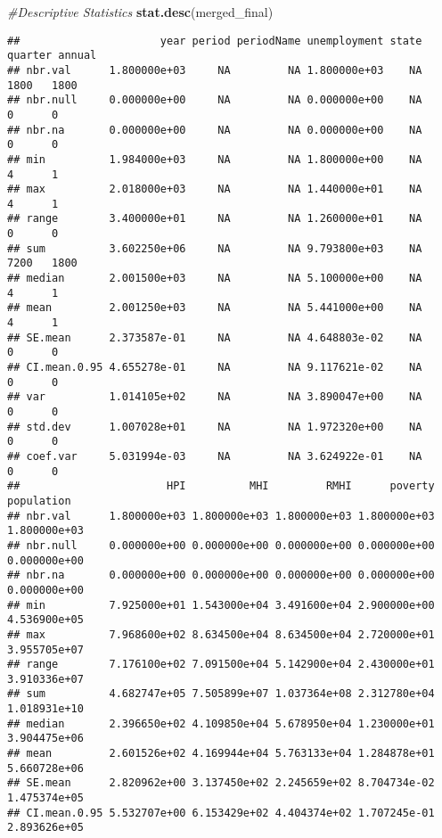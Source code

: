 \documentclass[
]{article}
\newenvironment{Shaded}{\begin{snugshade}}{\end{snugshade}}
\newcommand{\CommentTok}[1]{\textcolor[rgb]{0.56,0.35,0.01}{\textit{#1}}}
\newcommand{\KeywordTok}[1]{\textcolor[rgb]{0.13,0.29,0.53}{\textbf{#1}}}
\newcommand{\NormalTok}[1]{#1}
\begin{document}
\begin{Shaded}
\begin{Highlighting}[]
\CommentTok{#Descriptive Statistics}
\KeywordTok{stat.desc}\NormalTok{(merged_final)}
\end{Highlighting}
\end{Shaded}

\begin{verbatim}
##                      year period periodName unemployment state quarter annual
## nbr.val      1.800000e+03     NA         NA 1.800000e+03    NA    1800   1800
## nbr.null     0.000000e+00     NA         NA 0.000000e+00    NA       0      0
## nbr.na       0.000000e+00     NA         NA 0.000000e+00    NA       0      0
## min          1.984000e+03     NA         NA 1.800000e+00    NA       4      1
## max          2.018000e+03     NA         NA 1.440000e+01    NA       4      1
## range        3.400000e+01     NA         NA 1.260000e+01    NA       0      0
## sum          3.602250e+06     NA         NA 9.793800e+03    NA    7200   1800
## median       2.001500e+03     NA         NA 5.100000e+00    NA       4      1
## mean         2.001250e+03     NA         NA 5.441000e+00    NA       4      1
## SE.mean      2.373587e-01     NA         NA 4.648803e-02    NA       0      0
## CI.mean.0.95 4.655278e-01     NA         NA 9.117621e-02    NA       0      0
## var          1.014105e+02     NA         NA 3.890047e+00    NA       0      0
## std.dev      1.007028e+01     NA         NA 1.972320e+00    NA       0      0
## coef.var     5.031994e-03     NA         NA 3.624922e-01    NA       0      0
##                       HPI          MHI         RMHI      poverty   population
## nbr.val      1.800000e+03 1.800000e+03 1.800000e+03 1.800000e+03 1.800000e+03
## nbr.null     0.000000e+00 0.000000e+00 0.000000e+00 0.000000e+00 0.000000e+00
## nbr.na       0.000000e+00 0.000000e+00 0.000000e+00 0.000000e+00 0.000000e+00
## min          7.925000e+01 1.543000e+04 3.491600e+04 2.900000e+00 4.536900e+05
## max          7.968600e+02 8.634500e+04 8.634500e+04 2.720000e+01 3.955705e+07
## range        7.176100e+02 7.091500e+04 5.142900e+04 2.430000e+01 3.910336e+07
## sum          4.682747e+05 7.505899e+07 1.037364e+08 2.312780e+04 1.018931e+10
## median       2.396650e+02 4.109850e+04 5.678950e+04 1.230000e+01 3.904475e+06
## mean         2.601526e+02 4.169944e+04 5.763133e+04 1.284878e+01 5.660728e+06
## SE.mean      2.820962e+00 3.137450e+02 2.245659e+02 8.704734e-02 1.475374e+05
## CI.mean.0.95 5.532707e+00 6.153429e+02 4.404374e+02 1.707245e-01 2.893626e+05

\end{verbatim}
\end{document}

